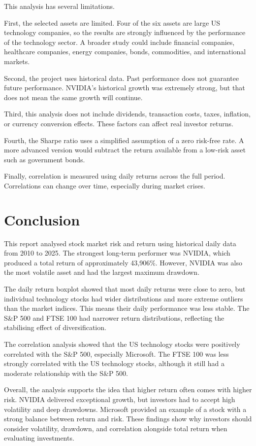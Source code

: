 \documentclass[12pt,a4paper]{article}
\begin{document}
This analysis has several limitations.

First, the selected assets are limited. Four of the six assets are large US technology companies, so the results are strongly influenced by the performance of the technology sector. A broader study could include financial companies, healthcare companies, energy companies, bonds, commodities, and international markets.

Second, the project uses historical data. Past performance does not guarantee future performance. NVIDIA's historical growth was extremely strong, but that does not mean the same growth will continue.

Third, this analysis does not include dividends, transaction costs, taxes, inflation, or currency conversion effects. These factors can affect real investor returns.

Fourth, the Sharpe ratio uses a simplified assumption of a zero risk-free rate. A more advanced version would subtract the return available from a low-risk asset such as government bonds.

Finally, correlation is measured using daily returns across the full period. Correlations can change over time, especially during market crises.

\section{Conclusion}

This report analysed stock market risk and return using historical daily data from 2010 to 2025. The strongest long-term performer was NVIDIA, which produced a total return of approximately 43,906\%. However, NVIDIA was also the most volatile asset and had the largest maximum drawdown.

The daily return boxplot showed that most daily returns were close to zero, but individual technology stocks had wider distributions and more extreme outliers than the market indices. This means their daily performance was less stable. The S\&P 500 and FTSE 100 had narrower return distributions, reflecting the stabilising effect of diversification.

The correlation analysis showed that the US technology stocks were positively correlated with the S\&P 500, especially Microsoft. The FTSE 100 was less strongly correlated with the US technology stocks, although it still had a moderate relationship with the S\&P 500.

Overall, the analysis supports the idea that higher return often comes with higher risk. NVIDIA delivered exceptional growth, but investors had to accept high volatility and deep drawdowns. Microsoft provided an example of a stock with a strong balance between return and risk. These findings show why investors should consider volatility, drawdown, and correlation alongside total return when evaluating investments.
\end{document}
